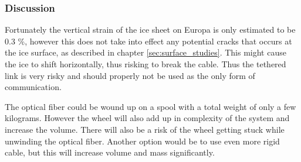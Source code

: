 \subsubsection{Discussion}

Fortunately the vertical strain of the ice sheet on Europa is only estimated to be 0.3 \%, however this does not take into effect any potential cracks that occurs at the ice surface, as described in chapter \ref{sec:surface_studies}. This might cause the ice to shift horizontally, thus risking to break the cable. Thus the tethered link is very risky and should properly not be used as the only form of communication\cite{book:communication}.

The optical fiber could be wound up on a spool with a total weight of only a few kilograms\cite{book:communication}. However the wheel will also add up in complexity of the system and increase the volume. There will also be a risk of the wheel getting stuck while unwinding the optical fiber. Another option would be to use even more rigid cable, but this will increase volume and mass significantly\citet{iceLink-scott}.
